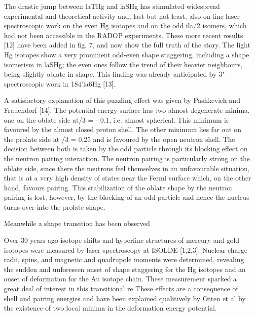 The drastic jump between laTHg and laSHg has stimulated widespread experimental
and theoretical activity and, last but not least, also on-line laser spectroscopic
work on the even Hg isotopes and on the odd ila/2 isomers, which had not been
accessible in the RADOP experiments. These more recent results [12] have been
added in fig. 7, and now show the full truth of the story. The light Hg isotopes show a
very prominent odd-even shape staggering, including a shape isomerism in laSHg; the
even ones follow the trend of their heavier neighbours, being slightly oblate in shape.
This finding was already anticipated by 3" spectroscopic work in 184'la6Hg [13]. 

A satisfactory explanation of this puzzling effect was given by Pashkevich
and Frauendorf [14]. The potential energy surface has two almost degenerate minima,
one on the oblate side at/3 = - 0.1, i.e. almost spherical. This minimum is favoured
by the almost closed proton shell. The other minimum lies far out on the prolate side
at /3 = 0.25 and is favoured by the open neutron shell. The decision between both is
taken by the odd particle through its blocking effect on the neutron pairing interaction.
The neutron pairing is particularly strong on the oblate side, since there the
neutrons feel themselves in an unfavourable situation, that is at a very high density
of states near the Fermi surface which, on the other hand, favours pairing. This stabilization
of the oblate shape by the neutron pairing is lost, however, by the blocking of
an odd particle and hence the nucleus turns over into the prolate shape. 



Meanwhile a shape transition has been observed

Over 30 years ago isotope shifts and hyperfine structures of mercury and gold isotopes were measured by laser spectroscopy at ISOLDE [1,2,3]. Nuclear charge radii, spins, and magnetic and quadrupole moments were determined, revealing the sudden and unforeseen onset of shape staggering for the Hg isotopes and an onset of deformation for the Au isotope chain.  These measurement sparked a great deal of interest in this transitional re
These effects are a consequence of shell and pairing energies and have been explained qualitively by Otten et al by the existence of two local minima in the deformation energy potential.





